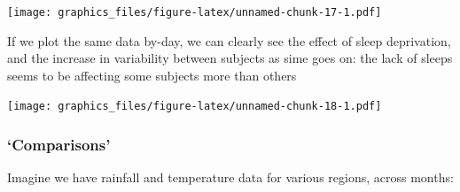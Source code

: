 \documentclass[]{article}
\newenvironment{Shaded}{\begin{snugshade}}{\end{snugshade}}
\newcommand{\KeywordTok}[1]{\textcolor[rgb]{0.13,0.29,0.53}{\textbf{#1}}}
\newcommand{\DataTypeTok}[1]{\textcolor[rgb]{0.13,0.29,0.53}{#1}}
\newcommand{\StringTok}[1]{\textcolor[rgb]{0.31,0.60,0.02}{#1}}
\newcommand{\OperatorTok}[1]{\textcolor[rgb]{0.81,0.36,0.00}{\textbf{#1}}}
\newcommand{\NormalTok}[1]{#1}
\theoremstyle{definition}
\theoremstyle{definition}
\theoremstyle{definition}
\theoremstyle{remark}
\begin{document}
\texttt{[image: graphics\_files/figure-latex/unnamed-chunk-17-1.pdf]}

If we plot the same data by-day, we can clearly see the effect of sleep
deprivation, and the increase in variability between subjects as sime
goes on: the lack of sleeps seems to be affecting some subjects more
than others

\begin{Shaded}
\end{Shaded}

\texttt{[image: graphics\_files/figure-latex/unnamed-chunk-18-1.pdf]}

\subsubsection*{\texorpdfstring{`Comparisons'}{Comparisons}}\label{comparisons}

Imagine we have rainfall and temperature data for various regions,
across months:

\begin{Shaded}
\end{Shaded}
\end{document}
